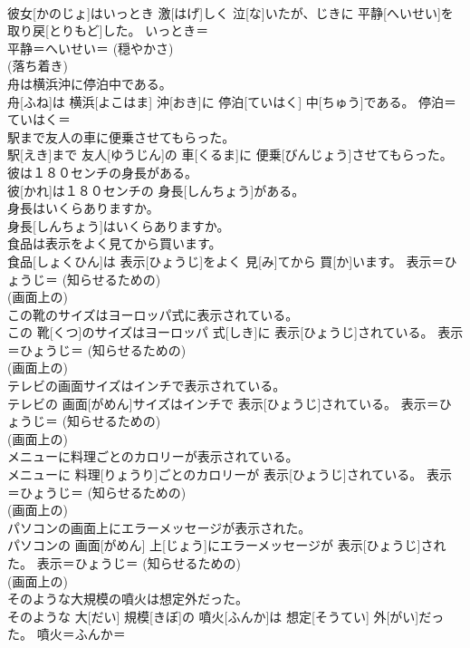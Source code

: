 \documentclass[8pt]{extreport}
\begin{document}
\begin{CJK}{UTF8}{min}
{\\	彼女[かのじょ]はいっとき 激[はげ]しく 泣[な]いたが、じきに 平静[へいせい]を 取り戻[とりもど]した。	いっとき＝ 
\\	平静＝へいせい＝ (穏やかさ) 
\\	(落ち着き) 
\\	舟は横浜沖に停泊中である。	
\\	舟[ふね]は 横浜[よこはま] 沖[おき]に 停泊[ていはく] 中[ちゅう]である。	停泊＝ていはく＝ 
\\	駅まで友人の車に便乗させてもらった。	
\\	駅[えき]まで 友人[ゆうじん]の 車[くるま]に 便乗[びんじょう]させてもらった。	
\\	彼は１８０センチの身長がある。	
\\	彼[かれ]は１８０センチの 身長[しんちょう]がある。	
\\	身長はいくらありますか。	
\\	身長[しんちょう]はいくらありますか。	
\\	食品は表示をよく見てから買います。	
\\	食品[しょくひん]は 表示[ひょうじ]をよく 見[み]てから 買[か]います。	表示＝ひょうじ＝ (知らせるための) 
\\	(画面上の) 
\\	この靴のサイズはヨーロッパ式に表示されている。	
\\	この 靴[くつ]のサイズはヨーロッパ 式[しき]に 表示[ひょうじ]されている。	表示＝ひょうじ＝ (知らせるための) 
\\	(画面上の) 
\\	テレビの画面サイズはインチで表示されている。	
\\	テレビの 画面[がめん]サイズはインチで 表示[ひょうじ]されている。	表示＝ひょうじ＝ (知らせるための) 
\\	(画面上の) 
\\	メニューに料理ごとのカロリーが表示されている。	
\\	メニューに 料理[りょうり]ごとのカロリーが 表示[ひょうじ]されている。	表示＝ひょうじ＝ (知らせるための) 
\\	(画面上の) 
\\	パソコンの画面上にエラーメッセージが表示された。	
\\	パソコンの 画面[がめん] 上[じょう]にエラーメッセージが 表示[ひょうじ]された。	表示＝ひょうじ＝ (知らせるための) 
\\	(画面上の) 
\\	そのような大規模の噴火は想定外だった。	
\\	そのような 大[だい] 規模[きぼ]の 噴火[ふんか]は 想定[そうてい] 外[がい]だった。	噴火＝ふんか＝ 
}
\end{CJK}
\end{document}

